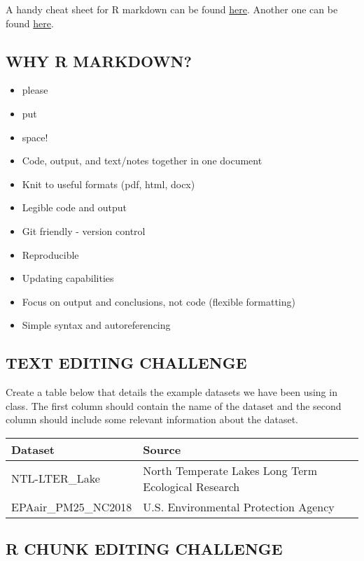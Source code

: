 \documentclass[]{article}
\begin{document}
A handy cheat sheet for R markdown can be found
\href{https://www.rstudio.com/wp-content/uploads/2015/03/rmarkdown-reference.pdf}{here}.
Another one can be found
\href{https://www.rstudio.com/wp-content/uploads/2015/02/rmarkdown-cheatsheet.pdf}{here}.

\subsection{WHY R MARKDOWN?}\label{why-r-markdown}

\begin{itemize}
\item
  please
\item
  put
\item
  space!
\item
  Code, output, and text/notes together in one document
\item
  Knit to useful formats (pdf, html, docx)
\item
  Legible code and output
\item
  Git friendly - version control
\item
  Reproducible
\item
  Updating capabilities
\item
  Focus on output and conclusions, not code (flexible formatting)
\item
  Simple syntax and autoreferencing
\end{itemize}

\subsection{TEXT EDITING CHALLENGE}\label{text-editing-challenge}

Create a table below that details the example datasets we have been
using in class. The first column should contain the name of the dataset
and the second column should include some relevant information about the
dataset.

\begin{longtable}[]{@{}ll@{}}
\toprule
Dataset & Source\tabularnewline
\midrule
\endhead
NTL-LTER\_Lake & North Temperate Lakes Long Term Ecological
Research\tabularnewline
EPAair\_PM25\_NC2018 & U.S. Environmental Protection
Agency\tabularnewline
\bottomrule
\end{longtable}

\subsection{R CHUNK EDITING CHALLENGE}\label{r-chunk-editing-challenge}
\end{document}
